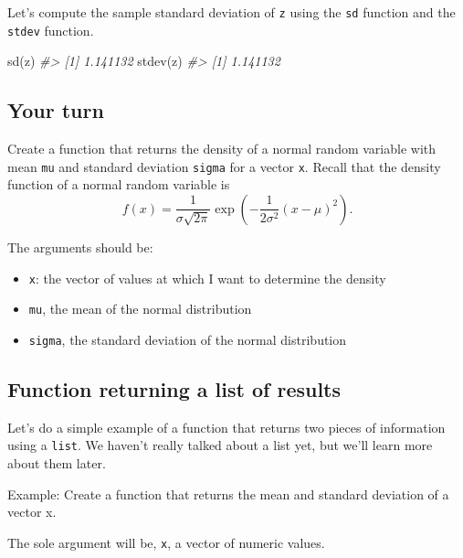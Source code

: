 \documentclass[
]{article}
\newenvironment{Shaded}{\begin{snugshade}}{\end{snugshade}}
\newcommand{\CommentTok}[1]{\textcolor[rgb]{0.56,0.35,0.01}{\textit{#1}}}
\newcommand{\FunctionTok}[1]{\textcolor[rgb]{0.00,0.00,0.00}{#1}}
\newcommand{\NormalTok}[1]{#1}
\providecommand{\tightlist}{%
  \setlength{\itemsep}{0pt}\setlength{\parskip}{0pt}}
\begin{document}
Let's compute the sample standard deviation of \texttt{z} using the
\texttt{sd} function and the \texttt{stdev} function.

\begin{Shaded}
\begin{Highlighting}[]
\FunctionTok{sd}\NormalTok{(z)}
\CommentTok{\#\textgreater{} [1] 1.141132}
\FunctionTok{stdev}\NormalTok{(z)}
\CommentTok{\#\textgreater{} [1] 1.141132}
\end{Highlighting}
\end{Shaded}

\hypertarget{your-turn-13}{%
\subsection{Your turn}\label{your-turn-13}}

Create a function that returns the density of a normal random variable
with mean \texttt{mu} and standard deviation \texttt{sigma} for a vector
\texttt{x}. Recall that the density function of a normal random variable
is
\[f(x) = \frac{1}{\sigma \sqrt{2 \pi}} \exp\left(-\frac{1}{2 \sigma^2} (x - \mu)^2\right).\]

The arguments should be:

\begin{itemize}
\tightlist
\item
  \texttt{x}: the vector of values at which I want to determine the
  density
\item
  \texttt{mu}, the mean of the normal distribution
\item
  \texttt{sigma}, the standard deviation of the normal distribution
\end{itemize}

\hypertarget{function-returning-a-list-of-results}{%
\subsection{Function returning a list of
results}\label{function-returning-a-list-of-results}}

Let's do a simple example of a function that returns two pieces of
information using a \texttt{list}. We haven't really talked about a list
yet, but we'll learn more about them later.

Example: Create a function that returns the mean and standard deviation
of a vector x.

The sole argument will be, \texttt{x}, a vector of numeric values.
\end{document}
